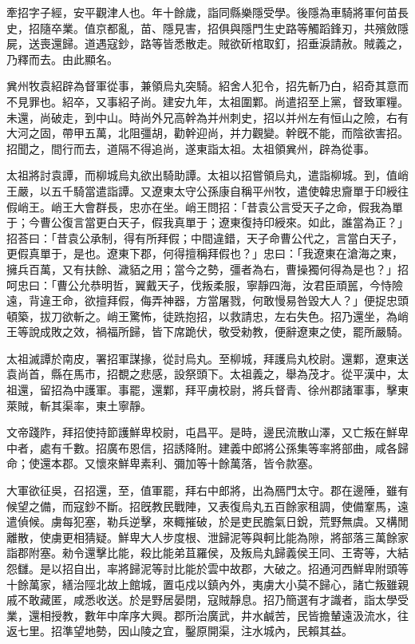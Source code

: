 
\begin{pinyinscope}
牽招字子經，安平觀津人也。年十餘歲，詣同縣樂隱受學。後隱為車騎將軍何苗長史，招隨卒業。值京都亂，苗、隱見害，招俱與隱門生史路等觸蹈鋒刃，共殯斂隱屍，送喪還歸。道遇寇鈔，路等皆悉散走。賊欲斫棺取釘，招垂淚請赦。賊義之，乃釋而去。由此顯名。

兾州牧袁紹辟為督軍從事，兼領烏丸突騎。紹舍人犯令，招先斬乃白，紹奇其意而不見罪也。紹卒，又事紹子尚。建安九年，太祖圍鄴。尚遣招至上黨，督致軍糧。未還，尚破走，到中山。時尚外兄高幹為并州刺史，招以并州左有恒山之險，右有大河之固，帶甲五萬，北阻彊胡，勸幹迎尚，并力觀變。幹旣不能，而陰欲害招。招聞之，間行而去，道隔不得追尚，遂東詣太祖。太祖領兾州，辟為從事。

太祖將討袁譚，而柳城烏丸欲出騎助譚。太祖以招嘗領烏丸，遣詣柳城。到，值峭王嚴，以五千騎當遣詣譚。又遼東太守公孫康自稱平州牧，遣使韓忠齎單于印綬往假峭王。峭王大會群長，忠亦在坐。峭王問招：「昔袁公言受天子之命，假我為單于；今曹公復言當更白天子，假我真單于；遼東復持印綬來。如此，誰當為正？」招荅曰：「昔袁公承制，得有所拜假；中間違錯，天子命曹公代之，言當白天子，更假真單于，是也。遼東下郡，何得擅稱拜假也？」忠曰：「我遼東在滄海之東，擁兵百萬，又有扶餘、濊貊之用；當今之勢，彊者為右，曹操獨何得為是也？」招呵忠曰：「曹公允恭明哲，翼戴天子，伐叛柔服，寧靜四海，汝君臣頑嚚，今恃險遠，背違王命，欲擅拜假，侮弄神器，方當屠戮，何敢慢易咎毀大人？」便捉忠頭頓築，拔刀欲斬之。峭王驚怖，徒跣抱招，以救請忠，左右失色。招乃還坐，為峭王等說成敗之效，禍福所歸，皆下席跪伏，敬受勑教，便辭遼東之使，罷所嚴騎。

太祖滅譚於南皮，署招軍謀掾，從討烏丸。至柳城，拜護烏丸校尉。還鄴，遼東送袁尚首，縣在馬市，招覩之悲感，設祭頭下。太祖義之，舉為茂才。從平漢中，太祖還，留招為中護軍。事罷，還鄴，拜平虜校尉，將兵督青、徐州郡諸軍事，擊東萊賊，斬其渠率，東土寧靜。

文帝踐阼，拜招使持節護鮮卑校尉，屯昌平。是時，邊民流散山澤，又亡叛在鮮卑中者，處有千數。招廣布恩信，招誘降附。建義中郎將公孫集等率將部曲，咸各歸命；使還本郡。又懷來鮮卑素利、彌加等十餘萬落，皆令款塞。

大軍欲征吳，召招還，至，值軍罷，拜右中郎將，出為鴈門太守。郡在邊陲，雖有候望之備，而寇鈔不斷。招旣教民戰陣，又表復烏丸五百餘家租調，使備鞌馬，遠遣偵候。虜每犯塞，勒兵逆擊，來輙摧破，於是吏民膽氣日銳，荒野無虞。又構閒離散，使虜更相猜疑。鮮卑大人步度根、泄歸泥等與軻比能為隙，將部落三萬餘家詣郡附塞。勑令還擊比能，殺比能弟苴羅侯，及叛烏丸歸義侯王同、王寄等，大結怨讎。是以招自出，率將歸泥等討比能於雲中故郡，大破之。招通河西鮮卑附頭等十餘萬家，繕治陘北故上館城，置屯戍以鎮內外，夷虜大小莫不歸心，諸亡叛雖親戚不敢藏匿，咸悉收送。於是野居晏閉，寇賊靜息。招乃簡選有才識者，詣太學受業，還相授教，數年中庠序大興。郡所治廣武，井水鹹苦，民皆擔輦遠汲流水，往返七里。招準望地勢，因山陵之宜，鑿原開渠，注水城內，民賴其益。


\end{pinyinscope}
